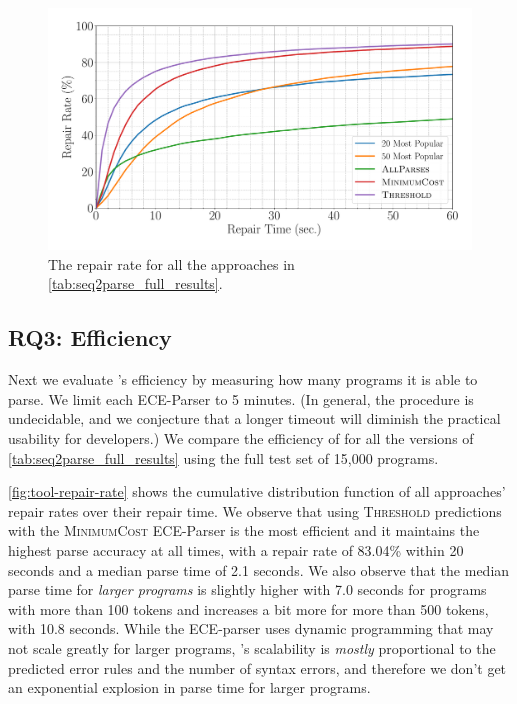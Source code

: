 \begin{figure}[t]
  \centering
  \includegraphics[width=0.85\linewidth]{tool-repair-rate.pdf}
  \caption{The repair rate for all the approaches in
  \autoref{tab:seq2parse_full_results}.}
  \label{fig:tool-repair-rate}
\end{figure}

\subsection{RQ3: Efficiency}
\label{sec:eval:efficiency}

Next we evaluate \toolname's efficiency by measuring how many programs it is
able to parse. We limit each ECE-Parser to 5 minutes. (In general, the procedure
is undecidable, and we conjecture that a longer timeout will diminish the
practical usability for developers.) We compare the efficiency of \toolname for
all the versions of \autoref{tab:seq2parse_full_results} using the full test set
of 15,000 programs.

\autoref{fig:tool-repair-rate} shows the cumulative distribution function of all
\toolname approaches' repair rates over their repair time. We observe that using
\textsc{Threshold} predictions with the \textsc{MinimumCost} ECE-Parser is the
most efficient and it maintains the highest parse accuracy at all times, with a
repair rate of 83.04\% within 20 seconds and a median parse time of 2.1 seconds.
We also observe that the median parse time for \emph{larger programs} is
slightly higher with 7.0 seconds for programs with more than 100 tokens and
increases a bit more for more than 500 tokens, with 10.8 seconds. While the
ECE-parser uses dynamic programming that may not scale greatly for larger
programs, \toolname's scalability is \emph{mostly} proportional to the predicted
error rules and the number of syntax errors, and therefore we don't get an
exponential explosion in parse time for larger programs. 

